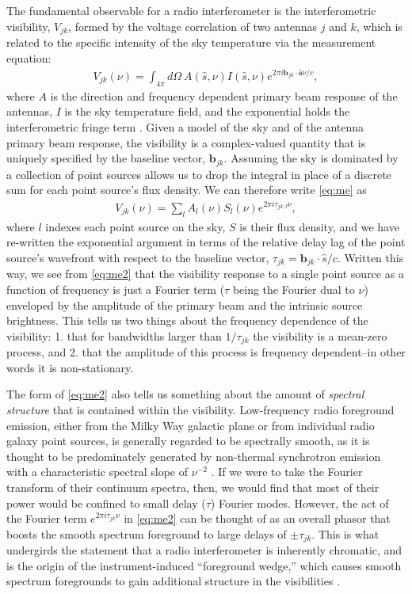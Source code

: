 \documentclass[a4paper,fleqn,usenatbib]{mnras}
\begin{document}
The fundamental observable for a radio interferometer is the interferometric visibility, $V_{jk}$, formed by the voltage correlation of two antennas $j$ and $k$, which is related to the specific intensity of the sky temperature via the measurement equation:
\begin{align}
\label{eq:me}
V_{jk}(\nu) = \int_{4\pi}d\Omega\ A(\hat{s}, \nu)I(\hat{s},\nu)e^{2\pi i\boldsymbol{b}_{jk}\cdot\boldsymbol{\hat{s}}\nu/c},
\end{align}
where $A$ is the direction and frequency dependent primary beam response of the antennas, $I$ is the sky temperature field, and the exponential holds the interferometric fringe term \citep{Thompson}.
Given a model of the sky and of the antenna primary beam response, the visibility is a complex-valued quantity that is uniquely specified by the baseline vector, $\boldsymbol{b}_{jk}$.
Assuming the sky is dominated by a collection of point sources allows us to drop the integral in place of a discrete sum for each point source's flux density.
We can therefore write \autoref{eq:me} as
\begin{align}
\label{eq:me2}
V_{jk}(\nu) = \sum_lA_l(\nu)S_l(\nu)e^{2\pi i\tau_{jk,l}\nu},
\end{align}
where $l$ indexes each point source on the sky, $S$ is their flux density, and we have re-written the exponential argument in terms of the relative delay lag of the point source's wavefront with respect to the baseline vector, $\tau_{jk} = \boldsymbol{b}_{jk}\cdot\hat{s}/c$.
Written this way, we see from \autoref{eq:me2} that the visibility response to a single point source as a function of frequency is just a Fourier term ($\tau$ being the Fourier dual to $\nu$) enveloped by the amplitude of the primary beam and the intrinsic source brightness.
This tells us two things about the frequency dependence of the visibility: 1. that for bandwidths larger than $1/\tau_{jk}$ the visibility is a mean-zero process, and 2. that the amplitude of this process is frequency dependent--in other words it is non-stationary.

The form of \autoref{eq:me2} also tells us something about the amount of \emph{spectral structure} that is contained within the visibility.
Low-frequency radio foreground emission, either from the Milky Way galactic plane or from individual radio galaxy point sources, is generally regarded to be spectrally smooth, as it is thought to be predominately generated by non-thermal synchrotron emission with a characteristic spectral slope of $\nu^{-2}$ \citep{Condon}.
If we were to take the Fourier transform of their continuum spectra, then, we would find that most of their power would be confined to small delay ($\tau$) Fourier modes.
However, the act of the Fourier term $e^{2\pi i\tau_{jk}\nu}$ in \autoref{eq:me2} can be thought of as an overall phasor that boosts the smooth spectrum foreground to large delays of $\pm\tau_{jk}$.
This is what undergirds the statement that a radio interferometer is inherently chromatic, and is the origin of the instrument-induced ``foreground wedge,'' which causes smooth spectrum foregrounds to gain additional structure in the visibilities \citep{Datta2010, Morales2012}.
\end{document}
